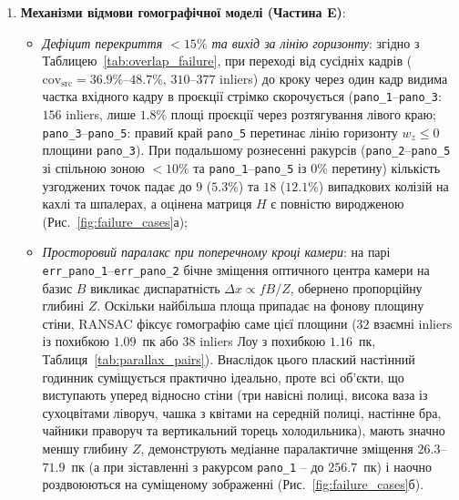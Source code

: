 \documentclass[14pt, a4paper]{extarticle}
\begin{document}
\begin{enumerate}
    \item \textbf{Механізми відмови гомографічної моделі (Частина E)}:
    \begin{itemize}
        \item \textit{Дефіцит перекриття $< 15\%$ та вихід за лінію горизонту}: згідно з Таблицею~\ref{tab:overlap_failure}, при переході від сусідніх кадрів ($\text{cov}_{\text{src}} = 36.9\%$--$48.7\%$, $310$--$377$ inliers) до кроку через один кадр видима частка вхідного кадру в проєкції стрімко скорочується (\texttt{pano\_1}--\texttt{pano\_3}: $156$ inliers, лише $1.8\%$ площі проєкції через розтягування лівого краю; \texttt{pano\_3}--\texttt{pano\_5}: правий край \texttt{pano\_5} перетинає лінію горизонту $w_z \le 0$ площини \texttt{pano\_3}). При подальшому рознесенні ракурсів (\texttt{pano\_2}--\texttt{pano\_5} зі спільною зоною $< 10\%$ та \texttt{pano\_1}--\texttt{pano\_5} із $0\%$ перетину) кількість узгоджених точок падає до $9$ ($5.3\%$) та $18$ ($12.1\%$) випадкових колізій на кахлі та шпалерах, а оцінена матриця $H$ є повністю виродженою (Рис.~\ref{fig:failure_cases}а);
        \item \textit{Просторовий паралакс при поперечному кроці камери}: на парі \texttt{err\_pano\_1}--\texttt{err\_pano\_2} бічне зміщення оптичного центра камери на базис $B$ викликає диспаратність $\Delta x \propto f B / Z$, обернено пропорційну глибині $Z$. Оскільки найбільша площа припадає на фонову площину стіни, RANSAC фіксує гомографію саме цієї площини ($32$ взаємні inliers із похибкою $1.09$~пк або $38$ inliers Лоу з похибкою $1.16$~пк, Таблиця~\ref{tab:parallax_pairs}). Внаслідок цього плаский настінний годинник суміщується практично ідеально, проте всі об'єкти, що виступають уперед відносно стіни (три навісні полиці, висока ваза із сухоцвітами ліворуч, чашка з квітами на середній полиці, настінне бра, чайники праворуч та вертикальний торець холодильника), мають значно меншу глибину $Z$, демонструють медіанне паралактичне зміщення $\mathbf{26.3}$--$\mathbf{71.9}$~пк (а при зіставленні з ракурсом \texttt{pano\_1} -- до $\mathbf{256.7}$~пк) і наочно роздвоюються на суміщеному зображенні (Рис.~\ref{fig:failure_cases}б).
    \end{itemize}
\end{enumerate}
\end{document}
